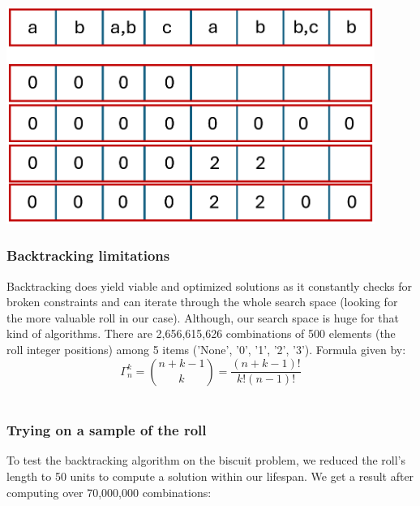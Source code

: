 \documentclass{modeleRapport}
\begin{document}
\begin{center}
    \includegraphics[width=12cm]{Images/backtrack_example.png}
\end{center}


\newpage

\subsubsection{Backtracking limitations}

Backtracking does yield viable and optimized solutions as it constantly checks for broken constraints
and can iterate through the whole search space (looking for the more valuable roll in our case). 
Although, our search space is huge for that kind of algorithms. There are 2,656,615,626 combinations of 500 elements 
(the roll integer positions) among 5 items ('None', '0', '1', '2', '3'). Formula given by:\\

\[ \Gamma^k_n=\binom{n+k-1}{k}=\frac{(n+k-1)!}{k!(n-1)!} \]\\

\subsubsection{Trying on a sample of the roll}

To test the backtracking algorithm on the biscuit problem, we reduced the roll's length to 50 units 
to compute a solution within our lifespan. We get a result after computing over 70,000,000 combinations:\\
\end{document}
